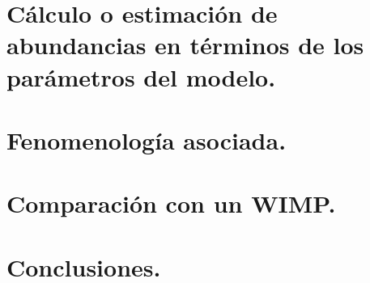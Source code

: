 \documentclass[11pt]{article}
\begin{document}
\section{Cálculo o estimación de abundancias en términos de los parámetros del modelo.}

\section{Fenomenología asociada.}

\section{Comparación con un WIMP.}

\section{Conclusiones.}



\end{document}
